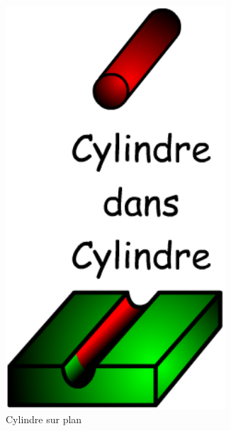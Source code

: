 \documentclass[10pt,fleqn]{article} %
\begin{document}
\begin{figure}[h]
\begin{subfigure}[b]{0.3\textwidth}
    \includegraphics[width=0.9\textwidth,height=.15\textheight,keepaspectratio]{images/surface_cylindre}
    \caption{Cylindre sur plan}
  \end{subfigure}\hfill
  \begin{subfigure}[b]{0.3\textwidth}
    \centering

\end{subfigure}
\end{figure}
\end{document}
